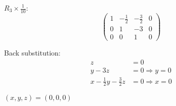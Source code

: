 $R_3 \times \frac{1}{10}$:
\[
	\left(\begin{array}{ccc|c}
			1 & -\frac{1}{2} & -\frac{3}{2} & 0 \\
			0 & 1           & -3           & 0 \\
			0 & 0           & 1            & 0
		\end{array}\right)
\]

Back substitution:
\begin{align*}
	z &= 0 \\
	y - 3z &= 0 \Rightarrow y = 0 \\
	x - \frac{1}{2}y - \frac{3}{2}z &= 0 \Rightarrow x = 0
\end{align*}

$\boxed{(x, y, z) = (0, 0, 0)}$